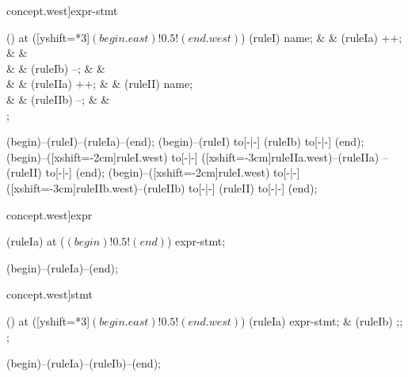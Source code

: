 \begin{syntax}[[xshift=22mm]concept.west]{expr-stmt}
  
  \node[sequence,anchor=north] () at ([yshift=\syntaxrulenodeheight-0.8pt*3]$(begin.east)!0.5!(end.west)$) {
    \node[nonterminal] (ruleI) {name};
    &
    &
    \node[terminal]    (ruleIa) {++};
    &
    &
    \\
    &
    &
    \node[terminal]    (ruleIb) {--};
    &
    &
    \\
    &
    &
    \node[terminal]    (ruleIIa) {++};
    &
    &
    \node[nonterminal] (ruleII) {name};
    \\
    &
    &
    \node[terminal]    (ruleIIb) {--};
    &
    &
    \\
  };
  
  \draw[path] (begin)--(ruleI)--(ruleIa)--(end);
  \draw[path] (begin)--(ruleI) to[-|-] (ruleIb) to[-|-] (end);
  \draw[path] (begin)--([xshift=-2cm]ruleI.west) to[-|-] ([xshift=-3cm]ruleIIa.west)--(ruleIIa) -- (ruleII) to[-|-] (end);
  \draw[path] (begin)--([xshift=-2cm]ruleI.west) to[-|-] ([xshift=-3cm]ruleIIb.west)--(ruleIIb) to[-|-] (ruleII) to[-|-] (end);
\end{syntax}
\begin{syntax}[[xshift=22mm]concept.west]{expr}
  
  \node[nonterminal] (ruleIa) at ($(begin)!0.5!(end)$) {expr-stmt};
  
  \draw[path] (begin)--(ruleIa)--(end);
\end{syntax}
\begin{syntax}[[xshift=22mm]concept.west]{stmt}
  
  
  \node[sequence,anchor=north] () at ([yshift=\syntaxrulenodeheight-0.8pt*3]$(begin.east)!0.5!(end.west)$) {
    \node[nonterminal] (ruleIa) {expr-stmt};
    &
    \node[terminal]    (ruleIb) {;};
    \\
  };
  
  \draw[path] (begin)--(ruleIa)--(ruleIb)--(end);
\end{syntax}

